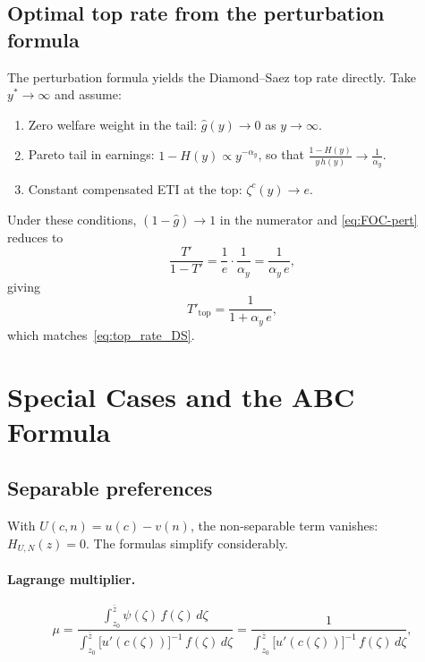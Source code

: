 \documentclass[12pt,a4paper]{article}
\theoremstyle{definition}
\theoremstyle{plain}
\theoremstyle{remark}
\newcommand{\zbar}{\bar{z}}
\newcommand{\zlow}{z_{\scriptscriptstyle 0}}
\begin{document}
\subsection{Optimal top rate from the perturbation formula}
\label{sec:top-rate-pert}

The perturbation formula yields the Diamond--Saez top rate
directly. Take $y^*\to\infty$ and assume:
\begin{enumerate}[label=(\alph*)]
  \item Zero welfare weight in the tail:
    $\hat g(y)\to 0$ as $y\to\infty$.
  \item Pareto tail in earnings: $1-H(y)\propto y^{-\alpha_y}$,
    so that $\frac{1-H(y)}{y\,h(y)}\to\frac{1}{\alpha_y}$.
  \item Constant compensated ETI at the top:
    $\zeta^c(y)\to e$.
\end{enumerate}
Under these conditions, $(1-\hat g)\to 1$ in the numerator and
\eqref{eq:FOC-pert} reduces to
\[
  \frac{T'}{1-T'}
  = \frac{1}{e}\cdot\frac{1}{\alpha_y}
  = \frac{1}{\alpha_y\,e},
\]
giving
\[
  T'_{\text{top}} = \frac{1}{1+\alpha_y\,e},
\]
which matches~\eqref{eq:top_rate_DS}.

\section{Special Cases and the ABC Formula}
\label{sec:special}

\subsection{Separable preferences}

With $U(c,n) = u(c) - v(n)$, the non-separable term vanishes: $H_{U,N}(z) = 0$. The formulas simplify considerably.

\paragraph{Lagrange multiplier.}
\begin{equation}
\label{eq:mu_sep}
  \mu = \frac{\displaystyle\int_{\zlow}^{\zbar} \psi(\zeta) \, f(\zeta) \, d\zeta}
             {\displaystyle\int_{\zlow}^{\zbar} \bigl[u'(c(\zeta))\bigr]^{-1} \, f(\zeta) \, d\zeta}
  = \frac{1}{\displaystyle\int_{\zlow}^{\zbar} \bigl[u'(c(\zeta))\bigr]^{-1} \, f(\zeta) \, d\zeta},
\end{equation}
\end{document}
